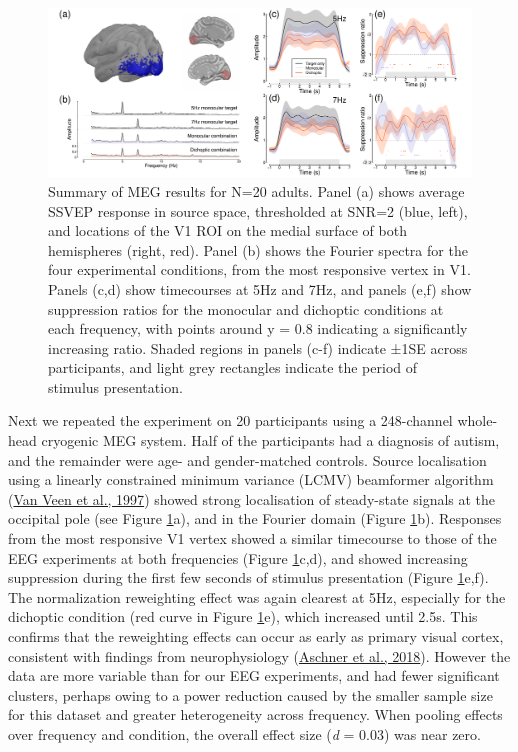 \documentclass[
]{article}
\begin{document}
\begin{figure}

{\centering \includegraphics{Figures/MEGdata} 

}

\caption{Summary of MEG results for N=20 adults. Panel (a) shows average SSVEP response in source space, thresholded at SNR=2 (blue, left), and locations of the V1 ROI on the medial surface of both hemispheres (right, red). Panel (b) shows the Fourier spectra for the four experimental conditions, from the most responsive vertex in V1. Panels (c,d) show timecourses at 5Hz and 7Hz, and panels (e,f) show suppression ratios for the monocular and dichoptic conditions at each frequency, with points around y = 0.8 indicating a significantly increasing ratio. Shaded regions in panels (c-f) indicate ±1SE across participants, and light grey rectangles indicate the period of stimulus presentation.}\label{fig:MEGdata}
\end{figure}

Next we repeated the experiment on 20 participants using a 248-channel whole-head cryogenic MEG system. Half of the participants had a diagnosis of autism, and the remainder were age- and gender-matched controls. Source localisation using a linearly constrained minimum variance (LCMV) beamformer algorithm (\protect\hyperlink{ref-VanVeen1997}{Van Veen et al., 1997}) showed strong localisation of steady-state signals at the occipital pole (see Figure \ref{fig:MEGdata}a), and in the Fourier domain (Figure \ref{fig:MEGdata}b). Responses from the most responsive V1 vertex showed a similar timecourse to those of the EEG experiments at both frequencies (Figure \ref{fig:MEGdata}c,d), and showed increasing suppression during the first few seconds of stimulus presentation (Figure \ref{fig:MEGdata}e,f). The normalization reweighting effect was again clearest at 5Hz, especially for the dichoptic condition (red curve in Figure \ref{fig:MEGdata}e), which increased until 2.5s. This confirms that the reweighting effects can occur as early as primary visual cortex, consistent with findings from neurophysiology (\protect\hyperlink{ref-Aschner2018}{Aschner et al., 2018}). However the data are more variable than for our EEG experiments, and had fewer significant clusters, perhaps owing to a power reduction caused by the smaller sample size for this dataset and greater heterogeneity across frequency. When pooling effects over frequency and condition, the overall effect size (\emph{d} = 0.03) was near zero.
\end{document}
